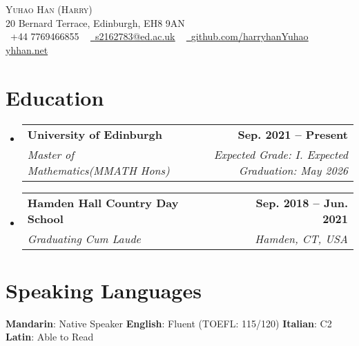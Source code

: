 \documentclass[letterpaper,11pt]{article}
\makeatletter
\newcommand{\resumeSubheading}[4]{
  \vspace{-2pt}\item
    \begin{tabular*}{1.0\textwidth}[t]{l@{\extracolsep{\fill}}r}
      \textbf{#1} & \textbf{\small #2} \\
      \textit{\small#3} & \textit{\small #4} \\
    \end{tabular*}\vspace{-7pt}
}
\newcommand{\resumeSubHeadingListStart}{\begin{itemize}[leftmargin=0.0in, label={}]}
\newcommand{\resumeSubHeadingListEnd}{\end{itemize}}
\makeatother
\begin{document}

\begin{center}
    {\Huge \scshape Yuhao Han (Harry)} \\ \vspace{1pt}
	20 Bernard Terrace, Edinburgh, EH8 9AN
    \\ \vspace{1pt}
    \small \raisebox{-0.1\height}\faPhone\ +44 7769466855 ~ \href{mailto:s2162783@ed.ac.uk}{\raisebox{-0.2\height}\faEnvelope\  \underline{s2162783@ed.ac.uk}} ~ 
    \href{https://github.com/harryhanYuhao}{\raisebox{-0.2\height}\faGithub\ \underline{github.com/harryhanYuhao}} ~
    \href{https://yhhan.net}{\raisebox{-0.2\height}\faChain \underline{yhhan.net}} ~

    \vspace{-8pt}
\end{center}


\section{Education}
  \resumeSubHeadingListStart
    \resumeSubheading
      {University of Edinburgh}{Sep. 2021 -- Present}
      {Master of Mathematics(MMATH Hons)}{Expected Grade: I. Expected Graduation: May 2026}
    \resumeSubheading
      {Hamden Hall Country Day School}{Sep. 2018 -- Jun. 2021}
      {Graduating Cum Laude}{Hamden, CT, USA}
  \resumeSubHeadingListEnd

\section{Speaking Languages}
\begin{multicols}{2}
        \textbf{Mandarin}: Native Speaker \hfill
        \textbf{English}: Fluent (TOEFL: 115/120) \hfill
        \textbf{Italian}: C2 \hfill
        \textbf{Latin}: Able to Read \hfill
 \end{multicols}
\end{document}
